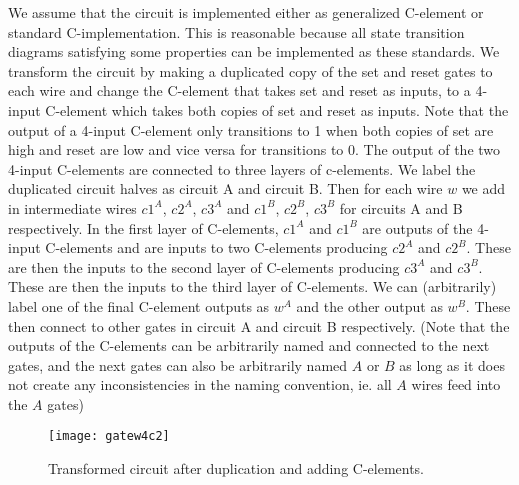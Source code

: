 \documentclass{article}
\begin{document}
We assume that the circuit is implemented either as generalized C-element or standard C-implementation.  This is reasonable because all state transition diagrams satisfying some properties can be implemented as these standards.  We transform the circuit by making a duplicated copy of the set and reset gates to each wire and change the C-element that takes set and reset as inputs, to a 4-input C-element which takes both copies of set and reset as inputs.  Note that the output of a 4-input C-element only transitions to 1 when both copies of set are high and reset are low and vice versa for transitions to 0.  The output of the two 4-input C-elements are connected to three layers of c-elements.  We label the duplicated circuit halves as circuit A and circuit B.  Then for each wire $w$ we add in intermediate wires $c1^A$, $c2^A$, $c3^A$ and $c1^B$, $c2^B$, $c3^B$ for circuits A and B respectively.  In the first layer of C-elements, $c1^A$ and $c1^B$ are outputs of the 4-input C-elements and are inputs to two C-elements producing $c2^A$ and $c2^B$.  These are then the inputs to the second layer of C-elements producing $c3^A$ and $c3^B$.  These are then the inputs to the third layer of C-elements.  We can (arbitrarily) label one of the final C-element outputs as $w^A$ and the other output as $w^B$.  These then connect to other gates in circuit A and circuit B respectively.  (Note that the outputs of the C-elements can be arbitrarily named and connected to the next gates, and the next gates can also be arbitrarily named $A$ or $B$ as long as it does not create any inconsistencies in the naming convention, ie. all $A$ wires feed into the $A$ gates) %
\newline
\begin{figure}
  \centering
    \texttt{[image: gatew4c2]}
  \caption{Transformed circuit after duplication and adding C-elements.}
\end{figure}
\end{document}
